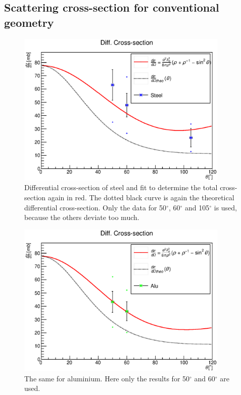 \documentclass{article}
\begin{document}
\subsection{Scattering cross-section for conventional geometry}
\begin{figure}[H]
    \centering
    \includegraphics[width=0.9\textwidth]{Graphen/cross-section/diff_cross_Steel_.eps}
    \caption{Differential cross-section of steel and fit to determine the total cross-section again in red. The dotted black curve is again the theoretical differential cross-section. Only the data for 50$^\circ$, 60$^\circ$ and 105$^\circ$ is used, because the others deviate too much.}
    \label{cross_alu}
\end{figure}
\begin{figure}[H]
    \centering
    \includegraphics[width=0.9\textwidth]{Graphen/cross-section/diff_cross_Alu_.eps}
    \caption{The same for aluminium. Here only the results for 50$^\circ$ and 60$^\circ$ are used. }
    \label{cross_steel}
\end{figure}
\end{document}
